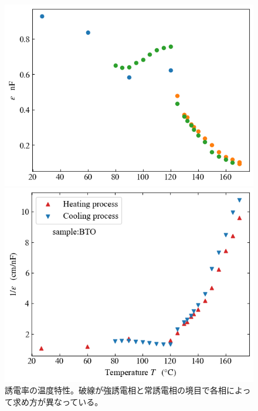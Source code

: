 \documentclass[9pt,dvipdfmx,a4paper]{jsarticle}
\begin{document}
\begin{figure}[H]
    \begin{minipage}[t]{0.48\columnwidth}
        \centering
        \includegraphics[width=\columnwidth]{BTO_epsilon-T.png}
    \end{minipage}
    \hfill
    \begin{minipage}[t]{0.48\columnwidth}
        \centering
        \includegraphics[width=\columnwidth]{BTO_epsilon-T1.png}
    \end{minipage}
    \caption{\small{誘電率の温度特性。破線が強誘電相と常誘電相の境目で各相によって求め方が異なっている。}}
    \label{graph:BTO_epsilon-T}
\end{figure}
\end{document}
